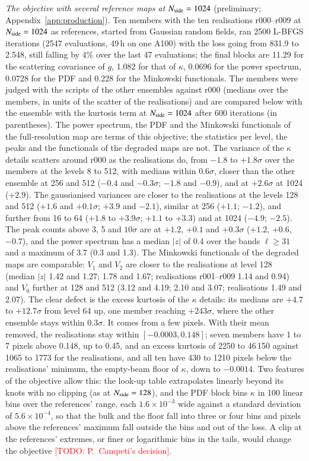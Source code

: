 \documentclass{aa}
\newcommand{\todo}[1]{\textcolor{red}{[TODO: #1]}}
\newcommand{\nside}{N_{\rm side}}
\begin{document}
\emph{The objective with several reference maps at $\nside=1024$} (preliminary; Appendix~\ref{app:production}). Ten members with the ten realisations r000--r009 at $\nside=1024$ as references, started from Gaussian random fields, ran 2500 L-BFGS iterations (2547 evaluations, 49\,h on one A100) with the loss going from 831.9 to 2.548, still falling by 4\% over the last 47 evaluations; the final blocks are 11.29 for the scattering covariance of $g$, 1.082 for that of $\kappa$, 0.0696 for the power spectrum, 0.0728 for the PDF and 0.228 for the Minkowski functionals. The members were judged with the scripts of the other ensembles against r000 (medians over the members, in units of the scatter of the realisations) and are compared below with the ensemble with the kurtosis term at $\nside=1024$ after 600 iterations (in parentheses). The power spectrum, the PDF and the Minkowski functionals of the full-resolution map are terms of this objective; the statistics per level, the peaks and the functionals of the degraded maps are not. The variance of the $\kappa$ details scatters around r000 as the realisations do, from $-1.8$ to $+1.8\sigma$ over the members at the levels 8 to 512, with medians within $0.6\sigma$, closer than the other ensemble at 256 and 512 ($-0.4$ and $-0.3\sigma$; $-1.8$ and $-0.9$), and at $+2.6\sigma$ at 1024 ($+2.9$). The gaussianised variances are closer to the realisations at the levels 128 and 512 ($+1.6$ and $+0.1\sigma$; $+3.9$ and $-2.1$), similar at 256 ($+1.1$; $-1.2$), and further from 16 to 64 ($+1.8$ to $+3.9\sigma$; $+1.1$ to $+3.3$) and at 1024 ($-4.9$; $-2.5$). The peak counts above 3, 5 and $10\sigma$ are at $+1.2$, $+0.1$ and $+0.3\sigma$ ($+1.2$, $+0.6$, $-0.7$), and the power spectrum has a median $|z|$ of 0.4 over the bands $\ell\geq31$ and a maximum of 3.7 (0.3 and 1.3). The Minkowski functionals of the degraded maps are comparable: $V_1$ and $V_2$ are closer to the realisations at level 128 (median $|z|$ 1.42 and 1.27; 1.78 and 1.67; realisations r001--r009 1.14 and 0.94) and $V_0$ further at 128 and 512 (3.12 and 4.19; 2.10 and 3.07; realisations 1.49 and 2.07). The clear defect is the excess kurtosis of the $\kappa$ details: its medians are $+4.7$ to $+12.7\sigma$ from level 64 up, one member reaching $+243\sigma$, where the other ensemble stays within $0.3\sigma$. It comes from a few pixels. With their mean removed, the realisations stay within $[-0.0003, 0.148]$; seven members have 1 to 7 pixels above 0.148, up to 0.45, and an excess kurtosis of 2250 to 46\,150 against 1065 to 1773 for the realisations, and all ten have 430 to 1210 pixels below the realisations' minimum, the empty-beam floor of $\kappa$, down to $-0.0014$. Two features of the objective allow this: the look-up table extrapolates linearly beyond its knots with no clipping (as at $\nside=128$), and the PDF block bins $\kappa$ in 100 linear bins over the references' range, each $1.6\times10^{-3}$ wide against a standard deviation of $5.6\times10^{-4}$, so that the bulk and the floor fall into three or four bins and pixels above the references' maximum fall outside the bins and out of the loss. A clip at the references' extremes, or finer or logarithmic bins in the tails, would change the objective \todo{P.~Campeti's decision}.
\end{document}
